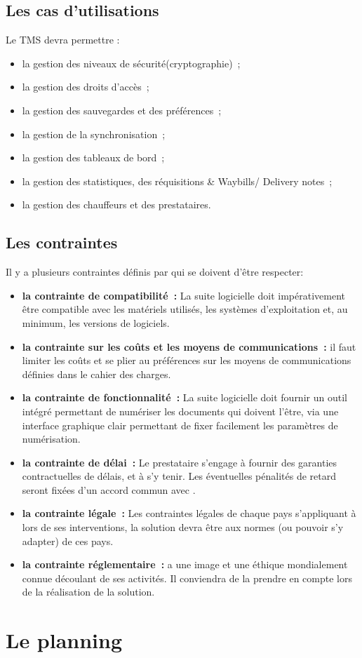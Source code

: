 \subsection{Les cas d'utilisations}
Le TMS devra permettre :
\begin{itemize}
\item la gestion des niveaux de sécurité(cryptographie)~;
\item la gestion des droits d'accès~;
\item la gestion des sauvegardes et des préférences~; 
\item la gestion de la synchronisation~;
\item la gestion des tableaux de bord~;
\item la gestion des statistiques, des réquisitions \& Waybills/ Delivery notes~;
\item la gestion des chauffeurs et des prestataires.
\end{itemize}

\subsection{Les contraintes}
Il y a plusieurs contraintes définis par \mo qui se doivent d'être respecter:
\begin{itemize}
\item \textbf{la contrainte de compatibilité~:} La suite logicielle doit impérativement être compatible avec les matériels utilisés, les systèmes d'exploitation et, au minimum, les versions de logiciels.

\item \textbf{la contrainte sur les coûts et les moyens de communications~:} il faut limiter les coûts et se plier au préférences sur les moyens de communications définies dans le cahier des charges.

\item \textbf{la contrainte de fonctionnalité~:} La suite logicielle doit fournir un outil intégré permettant de numériser les documents qui doivent l'être, via une interface graphique clair permettant de fixer facilement les paramètres de numérisation.

\item \textbf{la contrainte de délai~:} Le prestataire s'engage à fournir des garanties contractuelles de délais, et à s'y tenir. Les éventuelles pénalités de retard seront fixées d'un accord commun avec \mo.

\item \textbf{la contrainte légale~:} Les contraintes légales de chaque pays s'appliquant à \mo lors de ses interventions, la solution devra être aux normes (ou pouvoir s'y adapter) de ces pays.

\item \textbf{la contrainte réglementaire~:} \mo a une image et une éthique mondialement connue découlant de ses activités. Il conviendra de la prendre en compte lors de la réalisation de la solution.

\end{itemize}

\section{Le planning }
